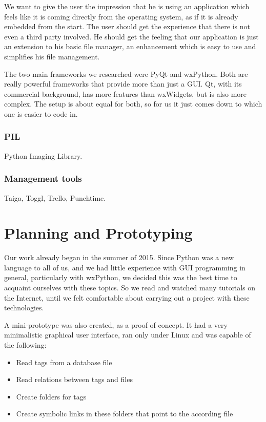 We want to give the user the impression that he is using an application which feels like it is coming directly from the operating system, as if it is already embedded from the start. The user should get the experience that there is not even a third party involved. He should get the feeling that our application is just an extension to his basic file manager, an enhancement which is easy to use and simplifies his file management.

The two main frameworks we researched were PyQt and wxPython. Both are really powerful frameworks that provide more than just a GUI. Qt, with its commercial background, has more features than wxWidgets, but is also more complex. The setup is about equal for both, so for us it just comes down to which one is easier to code in.

\subsubsection{PIL}
Python Imaging Library. %

\subsubsection{Management tools}
Taiga, Toggl, Trello, Punchtime. %

\section{Planning and Prototyping} %
\def\kapitelautor{Erik Ritschl}

Our work already began in the summer of 2015. Since Python was a new language
to all of us, and we had little experience with GUI programming in general,
particularly with wxPython, we decided this was the best time
to acquaint ourselves with these topics. So we read and watched many tutorials
on the Internet, until we felt comfortable about carrying out a project with
these technologies.

A mini-prototype was also created, as a proof of concept. It had a very
minimalistic graphical user interface, ran only under Linux and was capable of
the following:

\begin{itemize}
	\item Read tags from a database file
	\item Read relations between tags and files
	\item Create folders for tags
	\item Create symbolic links in these folders that point to the according file
\end{itemize}

